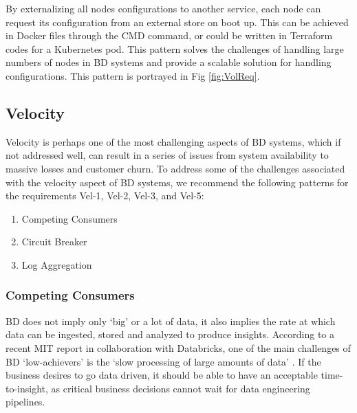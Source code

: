 \documentclass{bmcart}
\begin{document}
By externalizing all nodes configurations to another service, each node can request its configuration from an external store on boot up. This can be achieved in Docker files through the CMD command, or could be written in Terraform codes for a Kubernetes pod. This pattern solves the challenges of handling large numbers of nodes in BD systems and provide a scalable solution for handling configurations. This pattern is portrayed in Fig \ref{fig:VolReq}.


\subsection{Velocity}

Velocity is perhaps one of the most challenging aspects of BD systems, which if not addressed well, can result in a series of issues from system availability to massive losses and customer churn. To address some of the challenges associated with the velocity aspect of BD systems, we recommend the following patterns for the requirements Vel-1, Vel-2, Vel-3, and Vel-5:


\begin{enumerate}
  \item Competing Consumers
  \item Circuit Breaker
  \item Log Aggregation
\end{enumerate}


\subsubsection{Competing Consumers}

BD does not imply only `big' or a lot of data, it also implies the rate at which data can be ingested, stored and analyzed to produce insights. According to a recent MIT report in collaboration with Databricks, one of the main challenges of BD `low-achievers' is the `slow processing of large amounts of data' \cite{DataBricksSurvey}. If the business desires to go data driven, it should be able to have an acceptable time-to-insight, as critical business decisions cannot wait for data engineering pipelines. 
\end{document}
